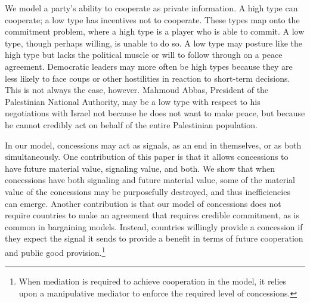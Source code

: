 \documentclass[bibtex,autowc]{apsr_submission}
\begin{document}



We model a party's ability to cooperate as private information. A high type can cooperate; a low type has incentives not to cooperate. These types map onto the commitment problem, where a high type is a player who is able to commit. A low type, though perhaps willing, is unable to do so. A low type may posture like the high type but lacks the political muscle or will to follow through on a peace agreement. Democratic leaders may more often be high types because they are less likely to face coups or other hostilities in reaction to short-term decisions. This is not always the case, however. Mahmoud Abbas, President of the Palestinian National Authority, may be a low type with respect to his negotiations with Israel not because he does not want to make peace, but because he cannot credibly act on behalf of the entire Palestinian population. 

In our model, concessions may act as signals, as an end in themselves, or as both simultaneously. One contribution of this paper is that it allows concessions to have future material value, signaling value, and both. We show that when concessions have both signaling and future material value, some of the material value of the concessions may be purposefully destroyed, and thus inefficiencies can emerge. Another contribution is that our model of concessions does not require countries to make an agreement that requires credible commitment, as is common in bargaining models. Instead, countries willingly provide a concession if they expect the signal it sends to provide a benefit in terms of future cooperation and public good provision.\footnote{When mediation is required to achieve cooperation in the model, it relies upon a manipulative mediator to enforce the required level of concessions.}
\end{document}
